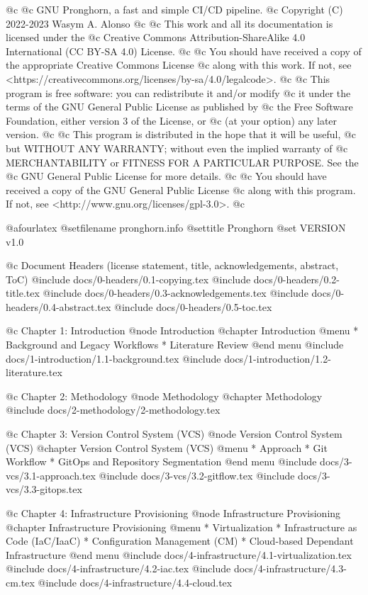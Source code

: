 


@c
@c GNU Pronghorn, a fast and simple CI/CD pipeline.
@c Copyright (C) 2022-2023 Wasym A. Alonso
@c
@c This work and all its documentation is licensed under the
@c Creative Commons Attribution-ShareAlike 4.0 International (CC BY-SA 4.0) License.
@c
@c You should have received a copy of the appropriate Creative Commons License
@c along with this work. If not, see <https://creativecommons.org/licenses/by-sa/4.0/legalcode>.
@c
@c This program is free software: you can redistribute it and/or modify
@c it under the terms of the GNU General Public License as published by
@c the Free Software Foundation, either version 3 of the License, or
@c (at your option) any later version.
@c
@c This program is distributed in the hope that it will be useful,
@c but WITHOUT ANY WARRANTY; without even the implied warranty of
@c MERCHANTABILITY or FITNESS FOR A PARTICULAR PURPOSE. See the
@c GNU General Public License for more details.
@c
@c You should have received a copy of the GNU General Public License
@c along with this program. If not, see <http://www.gnu.org/licenses/gpl-3.0>.
@c


@afourlatex
@setfilename pronghorn.info
@settitle Pronghorn
@set VERSION v1.0


@c Document Headers (license statement, title, acknowledgements, abstract, ToC)
@include docs/0-headers/0.1-copying.tex
@include docs/0-headers/0.2-title.tex
@include docs/0-headers/0.3-acknowledgements.tex
@include docs/0-headers/0.4-abstract.tex
@include docs/0-headers/0.5-toc.tex


@c Chapter 1: Introduction
@node Introduction
@chapter Introduction
@menu
* Background and Legacy Workflows
* Literature Review
@end menu
@include docs/1-introduction/1.1-background.tex
@include docs/1-introduction/1.2-literature.tex

@c Chapter 2: Methodology
@node Methodology
@chapter Methodology
@include docs/2-methodology/2-methodology.tex

@c Chapter 3: Version Control System (VCS)
@node Version Control System (VCS)
@chapter Version Control System (VCS)
@menu
* Approach
* Git Workflow
* GitOps and Repository Segmentation
@end menu
@include docs/3-vcs/3.1-approach.tex
@include docs/3-vcs/3.2-gitflow.tex
@include docs/3-vcs/3.3-gitops.tex

@c Chapter 4: Infrastructure Provisioning
@node Infrastructure Provisioning
@chapter Infrastructure Provisioning
@menu
* Virtualization
* Infrastructure as Code (IaC/IaaC)
* Configuration Management (CM)
* Cloud-based Dependant Infrastructure
@end menu
@include docs/4-infrastructure/4.1-virtualization.tex
@include docs/4-infrastructure/4.2-iac.tex
@include docs/4-infrastructure/4.3-cm.tex
@include docs/4-infrastructure/4.4-cloud.tex


